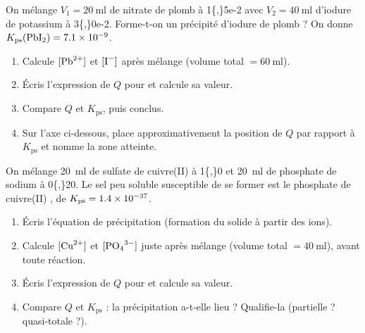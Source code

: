 \documentclass[11pt,a4paper]{article}
\newcommand{\Kps}{K_{\mathrm{ps}}}
\begin{document}
\begin{exercice}
On mélange $V_1=\qty{20}{\milli\litre}$ de nitrate de plomb  à \qty{1{,}5e-2}{\molar} avec
$V_2=\qty{40}{\milli\litre}$ d'iodure de potassium  à \qty{3{,}0e-2}{\molar}. Forme-t-on un
précipité d'iodure de plomb  ? On donne $\Kps(\ce{PbI2})=\num{7{,}1e-9}$.
\begin{enumerate}[label=\textbf{\alph*)},leftmargin=2.2em,topsep=2pt,itemsep=2pt]
  \item Calcule $[\ce{Pb^2+}]$ et $[\ce{I-}]$ après mélange (volume total $=\qty{60}{\milli\litre}$).
  \item Écris l'expression de $Q$ pour  et calcule sa valeur.
  \item Compare $Q$ et $\Kps$, puis conclus.
  \item Sur l'axe ci-dessous, place approximativement la position de $Q$ par rapport à $\Kps$ et nomme
        la zone atteinte.
  \begin{center}
  \end{center}
\end{enumerate}
\end{exercice}

\begin{exercice}
On mélange \qty{20}{\milli\litre} de sulfate de cuivre(II)  à \qty{1{,}0}{\molar} et
\qty{20}{\milli\litre} de phosphate de sodium  à \qty{0{,}20}{\molar}. Le sel peu soluble
susceptible de se former est le phosphate de cuivre(II) , de
$\Kps=\num{1{,}4e-37}$.
\begin{enumerate}[label=\textbf{\alph*)},leftmargin=2.2em,topsep=2pt,itemsep=2pt]
  \item Écris l'équation de précipitation (formation du solide à partir des ions).
  \item Calcule $[\ce{Cu^2+}]$ et $[\ce{PO4^3-}]$ juste après mélange (volume total $=\qty{40}{\milli\litre}$),
        avant toute réaction.
  \item Écris l'expression de $Q$ pour  et calcule sa valeur.
  \item Compare $Q$ et $\Kps$ : la précipitation a-t-elle lieu ? Qualifie-la (partielle ? quasi-totale ?).
\end{enumerate}
\end{exercice}
\end{document}
